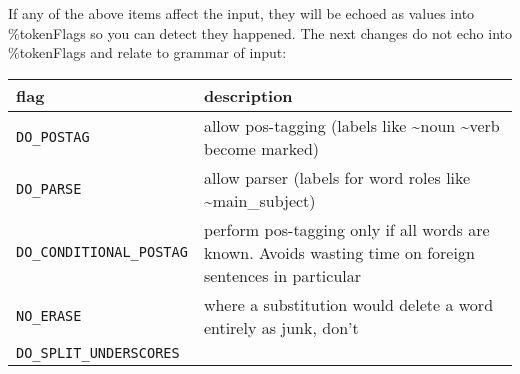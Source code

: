 \documentclass[]{article}
\begin{document}
If any of the above items affect the input, they will be echoed as
values into \%tokenFlags so you can detect they happened. The next
changes do not echo into \%tokenFlags and relate to grammar of input:

\begin{longtable}[]{@{}ll@{}}
\toprule
\begin{minipage}[b]{0.07\columnwidth}\raggedright\strut
flag\strut
\end{minipage} & \begin{minipage}[b]{0.10\columnwidth}\raggedright\strut
description\strut
\end{minipage}\tabularnewline
\midrule
\endhead
\begin{minipage}[t]{0.07\columnwidth}\raggedright\strut
\texttt{DO\_POSTAG}\strut
\end{minipage} & \begin{minipage}[t]{0.10\columnwidth}\raggedright\strut
allow pos-tagging (labels like \textasciitilde{}noun
\textasciitilde{}verb become marked)\strut
\end{minipage}\tabularnewline
\begin{minipage}[t]{0.07\columnwidth}\raggedright\strut
\texttt{DO\_PARSE}\strut
\end{minipage} & \begin{minipage}[t]{0.10\columnwidth}\raggedright\strut
allow parser (labels for word roles like
\textasciitilde{}main\_subject)\strut
\end{minipage}\tabularnewline
\begin{minipage}[t]{0.07\columnwidth}\raggedright\strut
\texttt{DO\_CONDITIONAL\_POSTAG}\strut
\end{minipage} & \begin{minipage}[t]{0.10\columnwidth}\raggedright\strut
perform pos-tagging only if all words are known. Avoids wasting time on
foreign sentences in particular\strut
\end{minipage}\tabularnewline
\begin{minipage}[t]{0.07\columnwidth}\raggedright\strut
\texttt{NO\_ERASE}\strut
\end{minipage} & \begin{minipage}[t]{0.10\columnwidth}\raggedright\strut
where a substitution would delete a word entirely as junk, don't\strut
\end{minipage}\tabularnewline
\begin{minipage}[t]{0.07\columnwidth}\raggedright\strut
\texttt{DO\_SPLIT\_UNDERSCORES}\strut
\end{minipage} & \begin{minipage}[t]{0.10\columnwidth}\raggedright\strut

\end{minipage}
\end{longtable}
\end{document}
